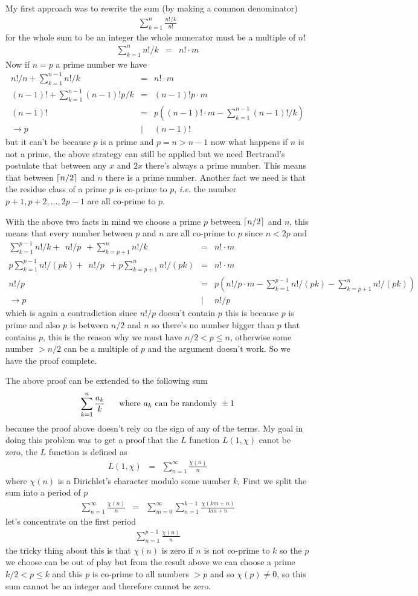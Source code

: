 \documentclass[aps,preprint,preprintnumbers,nofootinbib,showpacs,prd]{revtex4-1}
\newcommand{\ie}{{\it i.e.} }
\newcommand{\nbea}{\begin{eqnarray*}}
\newcommand{\neea}{\end{eqnarray*}}
\DeclarePairedDelimiter{\ceil}{\lceil}{\rceil}
\begin{document}
My first approach was to rewrite the sum (by making a common denominator)
%
\nbea
\sum_{k=1}^n \frac{n!/k}{n!}
\neea
%
for the whole sum to be an integer the whole numerator must be a multiple of $n!$
%
\nbea
\sum_{k=1}^n n!/k & = & n! \cdot m
\neea
%
Now if $n = p$ a prime number we have
%
\nbea
n!/n + \sum_{k=1}^{n-1} n!/k & = & n!\cdot m \\
(n-1)! + \sum_{k=1}^{n-1} (n-1)!p/k & = & (n-1)!p\cdot m \\
(n-1)! & = & p \left ( (n-1)!\cdot m - \sum_{k=1}^{n-1} (n-1)!/k \right ) \\
\to p &|& (n-1)!
\neea
%
but it can't be because $p$ is a prime and $p = n > n-1$ now what happens if $n$ is not a prime, the above strategy can still be applied but we need Bertrand's postulate that between any $x$ and $2x$ there's always a prime number. This means that between $\ceil{n/2}$ and $n$ there is a prime number. Another fact we need is that the residue class of a prime $p$ is co-prime to $p$, \ie the number $p+1, p+2, \dots, 2p-1$ are all co-prime to $p$.

With the above two facts in mind we choose a prime $p$ between $\ceil{n/2}$ and $n$, this means that every number between $p$ and $n$ are all co-prime to $p$ since $n < 2p$ and
%
\nbea
\sum_{k=1}^{p-1} n!/k + ~~n!/p~~ + \sum_{k=p+1}^{n} n!/k & = & n!\cdot m \\
p\sum_{k=1}^{p-1} n!/(pk) + ~~n!/p~~ + p\sum_{k=p+1}^{n} n!/(pk) & = & n!\cdot m \\
n!/p & = & p(n!/p\cdot m - \sum_{k=1}^{p-1} n!/(pk) - \sum_{k=p+1}^{n} n!/(pk))\\
\to p &|& n!/p
\neea
%
which is again a contradiction since $n!/p$ doesn't contain $p$ this is because $p$ is prime and also $p$ is between $n/2$ and $n$ so there's no number bigger than $p$ that contains $p$, this is the reason why we must have $n/2 < p \le n$, otherwise some number $> n/2$ can be a multiple of $p$ and the argument doesn't work. So we have the proof complete.

The above proof can be extended to the following sum
%
\nbea
\sum_{k=1}^n \frac{a_k}{k} ~~~~~ {\rm where~} a_k~{\rm can~be~randomly~} \pm 1
\neea
%
because the proof above doesn't rely on the sign of any of the terms. My goal in doing this problem was to get a proof that the $L$ function $L(1,\chi)$ canot be zero, the $L$ function is defined as
%
\nbea
L(1,\chi) & = & \sum_{n=1}^{\infty} \frac{\chi(n)}{n}
\neea
%
where $\chi(n)$ is a Dirichlet's character modulo some number $k$, First we split the sum into a period of $p$
%
\nbea
\sum_{n=1}^{\infty} \frac{\chi(n)}{n} & = & \sum_{m=0}^{\infty} \sum_{n=1}^{k-1} \frac{\chi(km + n)}{km + n}
\neea
%
let's concentrate on the first period
%
\nbea
\sum_{n=1}^{p-1} \frac{\chi(n)}{n}
\neea
%
the tricky thing about this is that $\chi(n)$ is zero if $n$ is not co-prime to $k$ so the $p$ we choose can be out of play but from the result above we can choose a prime $k/2 < p \le k$ and this $p$ is co-prime to all numbers $ > p$ and so $\chi(p) \neq 0$, so this sum cannot be an integer and therefore cannot be zero.
\end{document}
